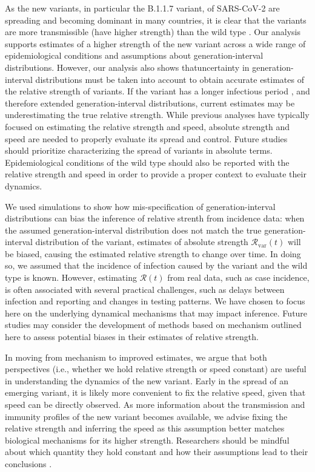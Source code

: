 \documentclass[12pt]{article}
\newcommand{\vvvar}{\mathrm{var}}
\newcommand{\Rx}[1]{\ensuremath{{\mathcal R}_{#1}}\xspace}
\newcommand{\RR}{\ensuremath{{\mathcal R}}\xspace}
\newcommand{\Rv}{\Rx{\vvvar}}
\begin{document}
As the new variants, in particular the B.1.1.7 variant, of SARS-CoV-2 are spreading and becoming dominant in many countries, it is clear that the variants are more transmissible (have higher strength) than the wild type \citep{switzerland2021variant, davies2021estimated, di2021impact, leung2021early, volz2021transmission,zhao2021}.
Our analysis supports estimates of a higher strength of the new variant across a wide range of epidemiological conditions and assumptions about generation-interval distributions.
However, our analysis also shows thatuncertainty in generation-interval distributions must be taken into account to obtain accurate estimates of the relative strength of variants.
If the variant has a longer infectious period \citep{kissler2021densely}, and therefore extended generation-interval distributions, current estimates may be underestimating the true relative strength.
While previous analyses have typically focused on estimating the relative strength and speed, absolute strength and speed are needed to properly evaluate its spread and control.
Future studies should prioritize characterizing the spread of variants in absolute terms.
Epidemiological conditions of the wild type should also be reported with the relative strength and speed in order to provide a proper context to evaluate their dynamics.

We used simulations to show how mis-specification of generation-interval distributions can bias the inference of relative strenth from incidence data:
when the assumed generation-interval distribution does not match the true generation-interval distribution of the variant, estimates of absolute strength $\Rv(t)$ will be biased, causing the estimated relative strength to change over time.
In doing so, we assumed that the incidence of infection caused by the variant and the wild type is known.
However, estimating $\RR(t)$ from real data, such as case incidence, is often associated with several practical challenges, such as delays between infection and reporting and changes in testing patterns.
We have chosen to focus here on the underlying dynamical mechanisms that may impact inference.
Future studies may consider the development of methods based on mechanism outlined here to assess potential biases in their estimates of relative strength. 

In moving from mechanism to improved estimates, we argue that both perspectives (i.e., whether we hold relative strength or speed constant) are useful in understanding the dynamics of the new variant.
Early in the spread of an emerging variant, it is likely more convenient to fix the relative speed, given that speed can be directly observed.
As more information about the transmission and immunity profiles of the new variant becomes available, we advise fixing the relative strength and inferring the speed as this assumption better matches biological mechanisms for its higher strength.
Researchers should be mindful about which quantity they hold constant and how their assumptions lead to their conclusions \citep{doi:10.1098/rspb.2020.1556}.
\end{document}

